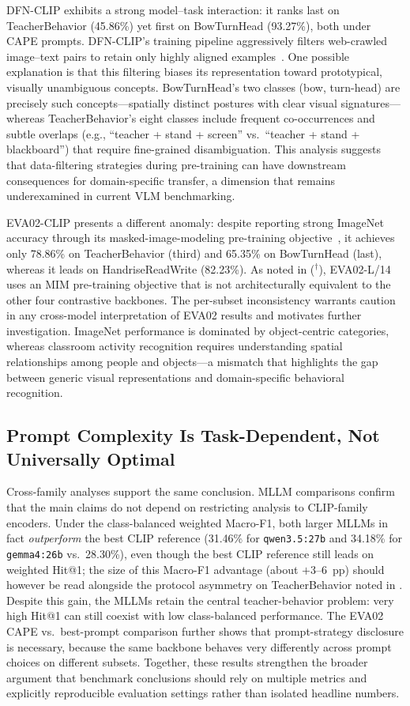 \documentclass[symmetry,article,submit,pdftex,moreauthors]{Definitions/mdpi}
\begin{document}
DFN-CLIP exhibits a strong model--task interaction: it ranks last on TeacherBehavior (45.86\%) yet first on BowTurnHead (93.27\%), both under CAPE prompts.
DFN-CLIP's training pipeline aggressively filters web-crawled image--text pairs to retain only highly aligned examples~\cite{fang2023data}. One possible explanation is that this filtering biases its representation toward prototypical, visually unambiguous concepts.
BowTurnHead's two classes (bow, turn-head) are precisely such concepts---spatially distinct postures with clear visual signatures---whereas TeacherBehavior's eight classes include frequent co-occurrences and subtle overlaps (e.g., ``teacher + stand + screen'' vs.\ ``teacher + stand + blackboard'') that require fine-grained disambiguation.
This analysis suggests that data-filtering strategies during pre-training can have downstream consequences for domain-specific transfer, a dimension that remains underexamined in current VLM benchmarking.

EVA02-CLIP presents a different anomaly: despite reporting strong ImageNet accuracy through its masked-image-modeling pre-training objective~\cite{sun2023eva02}, it achieves only 78.86\% on TeacherBehavior (third) and 65.35\% on BowTurnHead (last), whereas it leads on HandriseReadWrite (82.23\%). As noted in  ($^{\dagger}$), EVA02-L/14 uses an MIM pre-training objective that is not architecturally equivalent to the other four contrastive backbones. The per-subset inconsistency warrants caution in any cross-model interpretation of EVA02 results and motivates further investigation.
ImageNet performance is dominated by object-centric categories, whereas classroom activity recognition requires understanding spatial relationships among people and objects---a mismatch that highlights the gap between generic visual representations and domain-specific behavioral recognition.

\subsection{Prompt Complexity Is Task-Dependent, Not Universally Optimal}

Cross-family analyses support the same conclusion. MLLM comparisons confirm that the main claims do not depend on restricting analysis to CLIP-family encoders. Under the class-balanced weighted Macro-F1, both larger MLLMs in fact \emph{outperform} the best CLIP reference (31.46\% for \texttt{qwen3.5:27b} and 34.18\% for \texttt{gemma4:26b} vs.\ 28.30\%), even though the best CLIP reference still leads on weighted Hit@1; the size of this Macro-F1 advantage (about $+3$--$6$~pp) should however be read alongside the protocol asymmetry on TeacherBehavior noted in . Despite this gain, the MLLMs retain the central teacher-behavior problem: very high Hit@1 can still coexist with low class-balanced performance. The EVA02 CAPE vs.\ best-prompt comparison further shows that prompt-strategy disclosure is necessary, because the same backbone behaves very differently across prompt choices on different subsets. Together, these results strengthen the broader argument that benchmark conclusions should rely on multiple metrics and explicitly reproducible evaluation settings rather than isolated headline numbers.
\end{document}
